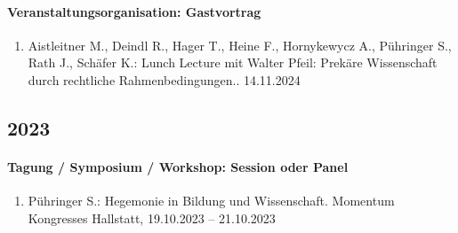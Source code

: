 \paragraph{Veranstaltungsorganisation: Gastvortrag}
\begin{enumerate}[leftmargin=*, labelsep=0.5cm]
\item Aistleitner M., Deindl R., Hager T., Heine F., Hornykewycz A., Pühringer S., Rath J., Schäfer K.: Lunch Lecture mit Walter Pfeil: Prekäre Wissenschaft durch rechtliche Rahmenbedingungen.. 14.11.2024
\end{enumerate}\subsection*{2023}\paragraph{Tagung / Symposium / Workshop: Session oder Panel}
\begin{enumerate}[leftmargin=*, labelsep=0.5cm]
\item Pühringer S.: Hegemonie in Bildung und Wissenschaft. Momentum Kongresses Hallstatt, 19.10.2023 -- 21.10.2023
\end{enumerate}
